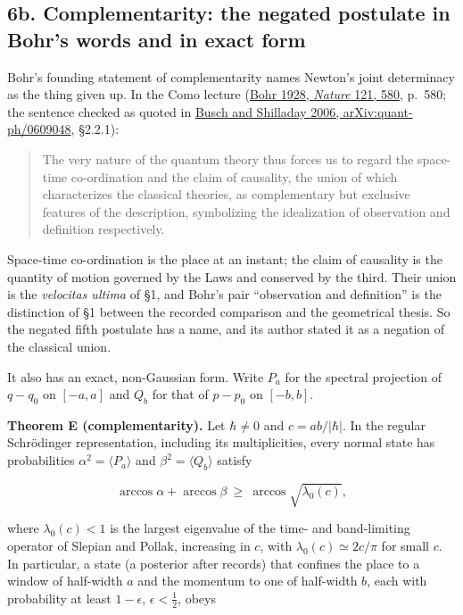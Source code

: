\documentclass[11pt,a4paper]{article}
\begin{document}
\hypertarget{b.-complementarity-the-negated-postulate-in-bohrs-words-and-in-exact-form}{%
\subsection{6b. Complementarity: the negated postulate in Bohr's words
and in exact
form}\label{b.-complementarity-the-negated-postulate-in-bohrs-words-and-in-exact-form}}

Bohr's founding statement of complementarity names Newton's joint
determinacy as the thing given up. In the Como lecture
(\href{https://doi.org/10.1038/121580a0}{Bohr 1928, \emph{Nature} 121,
580}, p.~580; the sentence checked as quoted in
\href{https://arxiv.org/abs/quant-ph/0609048}{Busch and Shilladay 2006,
arXiv:quant-ph/0609048}, §2.2.1):

\begin{quote}
The very nature of the quantum theory thus forces us to regard the
space-time co-ordination and the claim of causality, the union of which
characterizes the classical theories, as complementary but exclusive
features of the description, symbolizing the idealization of observation
and definition respectively.
\end{quote}

Space-time co-ordination is the place at an instant; the claim of
causality is the quantity of motion governed by the Laws and conserved
by the third. Their union is the \emph{velocitas ultima} of §1, and
Bohr's pair ``observation and definition'' is the distinction of §1
between the recorded comparison and the geometrical thesis. So the
negated fifth postulate has a name, and its author stated it as a
negation of the classical union.

It also has an exact, non-Gaussian form. Write \(P_a\) for the spectral
projection of \(q-q_0\) on \([-a,a]\) and \(Q_b\) for that of \(p-p_0\)
on \([-b,b]\).

\textbf{Theorem E (complementarity).} Let \(\hbar\ne0\) and
\(c=ab/|\hbar|\). In the regular Schrödinger representation, including
its multiplicities, every normal state has probabilities
\(\alpha^2=\langle P_a\rangle\) and \(\beta^2=\langle Q_b\rangle\)
satisfy

\[\arccos\alpha+\arccos\beta\ \ge\ \arccos\sqrt{\lambda_0(c)},\]

where \(\lambda_0(c)<1\) is the largest eigenvalue of the time- and
band-limiting operator of Slepian and Pollak, increasing in \(c\), with
\(\lambda_0(c)\simeq2c/\pi\) for small \(c\). In particular, a state (a
posterior after records) that confines the place to a window of
half-width \(a\) and the momentum to one of half-width \(b\), each with
probability at least \(1-\epsilon\), \(\epsilon<\frac12\), obeys
\end{document}
